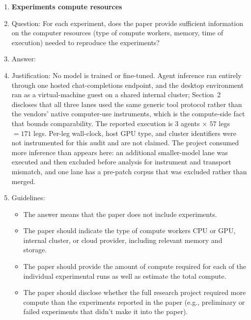 \begin{enumerate}
\item {\bf Experiments compute resources}
    \item[] Question: For each experiment, does the paper provide sufficient information on the computer resources (type of compute workers, memory, time of execution) needed to reproduce the experiments?
    \item[] Answer: \answerYes{}
    \item[] Justification: No model is trained or fine-tuned. Agent inference ran entirely through one hosted chat-completions endpoint, and the desktop environment ran as a virtual-machine guest on a shared internal cluster; Section~2 discloses that all three lanes used the same generic tool protocol rather than the vendors' native computer-use instruments, which is the compute-side fact that bounds comparability. The reported execution is $3$ agents $\times$ $57$ legs $=171$ legs. Per-leg wall-clock, host GPU type, and cluster identifiers were not instrumented for this audit and are not claimed. The project consumed more inference than appears here: an additional smaller-model lane was executed and then excluded before analysis for instrument and transport mismatch, and one lane has a pre-patch corpus that was excluded rather than merged.
    \item[] Guidelines:
    \begin{itemize}
        \item The answer \answerNA{} means that the paper does not include experiments.
        \item The paper should indicate the type of compute workers CPU or GPU, internal cluster, or cloud provider, including relevant memory and storage.
        \item The paper should provide the amount of compute required for each of the individual experimental runs as well as estimate the total compute. 
        \item The paper should disclose whether the full research project required more compute than the experiments reported in the paper (e.g., preliminary or failed experiments that didn't make it into the paper). 
    \end{itemize}
    

\end{enumerate}
